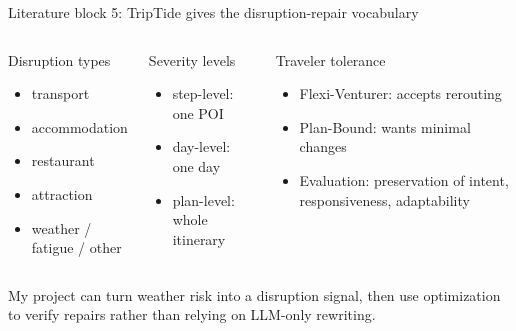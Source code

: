 \documentclass[aspectratio=169,10pt]{beamer}
\newcommand{\smallcite}[1]{\vspace{0.15em}{\footnotesize\textcolor{DarkGray}{#1}}}
\begin{document}
\begin{frame}{Literature block 5: TripTide gives the disruption-repair vocabulary}
\begin{columns}[T,onlytextwidth]
\begin{block}{Disruption types}
\begin{itemize}
  \item transport
  \item accommodation
  \item restaurant
  \item attraction
  \item weather / fatigue / other
\end{itemize}
\end{block}

\begin{block}{Severity levels}
\begin{itemize}
  \item step-level: one POI
  \item day-level: one day
  \item plan-level: whole itinerary
\end{itemize}
\end{block}

\begin{block}{Traveler tolerance}
\begin{itemize}
  \item Flexi-Venturer: accepts rerouting
  \item Plan-Bound: wants minimal changes
  \item Evaluation: preservation of intent, responsiveness, adaptability
\end{itemize}
\end{block}
\end{columns}

\vspace{0.55em}
\centering
\colorbox{LightRed}{\parbox{0.88\textwidth}{\centering\small My project can turn weather risk into a disruption signal, then use optimization to verify repairs rather than relying on LLM-only rewriting.}}
\smallcite{TripTide 2025, treated as recent disruption-aware travel planning work}
\end{frame}
\end{document}
